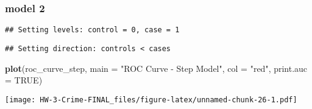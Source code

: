 \documentclass[
]{article}
\newenvironment{Shaded}{\begin{snugshade}}{\end{snugshade}}
\newcommand{\AttributeTok}[1]{\textcolor[rgb]{0.13,0.29,0.53}{#1}}
\newcommand{\ConstantTok}[1]{\textcolor[rgb]{0.56,0.35,0.01}{#1}}
\newcommand{\FunctionTok}[1]{\textcolor[rgb]{0.13,0.29,0.53}{\textbf{#1}}}
\newcommand{\NormalTok}[1]{#1}
\newcommand{\OtherTok}[1]{\textcolor[rgb]{0.56,0.35,0.01}{#1}}
\newcommand{\SpecialCharTok}[1]{\textcolor[rgb]{0.81,0.36,0.00}{\textbf{#1}}}
\newcommand{\StringTok}[1]{\textcolor[rgb]{0.31,0.60,0.02}{#1}}
\begin{document}
\hypertarget{model-2-1}{%
\subsubsection{model 2}\label{model-2-1}}

\begin{Shaded}
\end{Shaded}

\begin{verbatim}
## Setting levels: control = 0, case = 1
\end{verbatim}

\begin{verbatim}
## Setting direction: controls < cases
\end{verbatim}

\begin{Shaded}
\begin{Highlighting}[]
\FunctionTok{plot}\NormalTok{(roc\_curve\_step, }\AttributeTok{main =} \StringTok{"ROC Curve {-} Step Model"}\NormalTok{, }\AttributeTok{col =} \StringTok{"red"}\NormalTok{, }\AttributeTok{print.auc =} \ConstantTok{TRUE}\NormalTok{)}
\end{Highlighting}
\end{Shaded}

\texttt{[image: HW-3-Crime-FINAL\_files/figure-latex/unnamed-chunk-26-1.pdf]}
\end{document}
